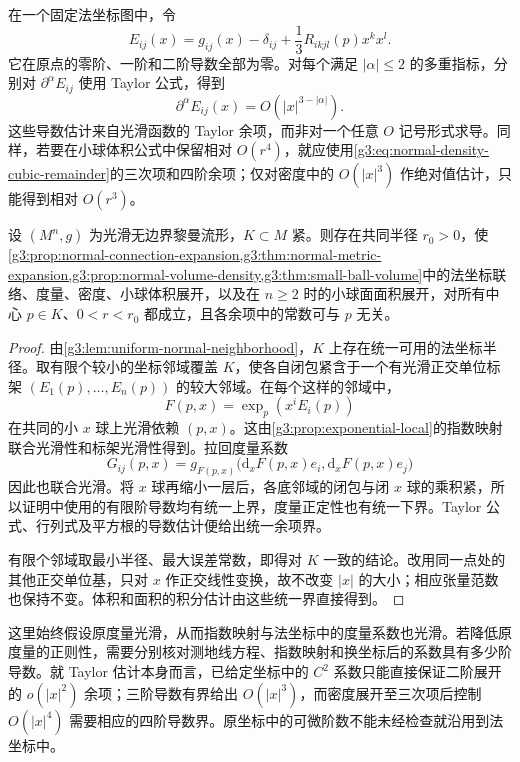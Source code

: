 \ProseParagraphBreak

在一个固定法坐标图中，令
\[
	E_{ij}(x)=g_{ij}(x)-\delta_{ij}+\frac13R_{ikjl}(p)x^kx^l.
\]
它在原点的零阶、一阶和二阶导数全部为零。对每个满足 \(|\alpha|\le2\) 的多重指标，分别对 \(\partial^\alpha E_{ij}\) 使用 Taylor 公式，得到
\begin{equation}\label{g3:eq:normal-metric-remainder-derivatives}
	\partial^\alpha E_{ij}(x)=O(|x|^{3-|\alpha|}).
\end{equation}
这些导数估计来自光滑函数的 Taylor 余项，而非对一个任意 \(O\) 记号形式求导。同样，若要在小球体积公式中保留相对 \(O(r^4)\)，就应使用\eqref{g3:eq:normal-density-cubic-remainder}的三次项和四阶余项；仅对密度中的 \(O(|x|^3)\) 作绝对值估计，只能得到相对 \(O(r^3)\)。

\begin{proposition}\label{g3:prop:normal-expansion-uniform-remainders}
	设 \((M^n,g)\) 为光滑无边界黎曼流形，\(K\subset M\) 紧。则存在共同半径 \(r_0>0\)，使\cref{g3:prop:normal-connection-expansion,g3:thm:normal-metric-expansion,g3:prop:normal-volume-density,g3:thm:small-ball-volume}中的法坐标联络、度量、密度、小球体积展开，以及在 \(n\ge2\) 时的小球面面积展开，对所有中心 \(p\in K\)、\(0<r<r_0\) 都成立，且各余项中的常数可与 \(p\) 无关。
\end{proposition}
\begin{proof}
	由\cref{g3:lem:uniform-normal-neighborhood}，\(K\) 上存在统一可用的法坐标半径。取有限个较小的坐标邻域覆盖 \(K\)，使各自闭包紧含于一个有光滑正交单位标架 \((E_1(p),\ldots,E_n(p))\) 的较大邻域。在每个这样的邻域中，
	\[
		F(p,x)=\exp_p(x^iE_i(p))
	\]
	在共同的小 \(x\) 球上光滑依赖 \((p,x)\)。这由\cref{g3:prop:exponential-local}的指数映射联合光滑性和标架光滑性得到。拉回度量系数
	\[
		G_{ij}(p,x)=g_{F(p,x)}
		\bigl(\mathrm d_xF(p,x)e_i,\mathrm d_xF(p,x)e_j\bigr)
	\]
	因此也联合光滑。将 \(x\) 球再缩小一层后，各底邻域的闭包与闭 \(x\) 球的乘积紧，所以证明中使用的有限阶导数均有统一上界，度量正定性也有统一下界。Taylor 公式、行列式及平方根的导数估计便给出统一余项界。

	有限个邻域取最小半径、最大误差常数，即得对 \(K\) 一致的结论。改用同一点处的其他正交单位基，只对 \(x\) 作正交线性变换，故不改变 \(|x|\) 的大小；相应张量范数也保持不变。体积和面积的积分估计由这些统一界直接得到。
\end{proof}

这里始终假设原度量光滑，从而指数映射与法坐标中的度量系数也光滑。若降低原度量的正则性，需要分别核对测地线方程、指数映射和换坐标后的系数具有多少阶导数。就 Taylor 估计本身而言，已给定坐标中的 \(C^2\) 系数只能直接保证二阶展开的 \(o(|x|^2)\) 余项；三阶导数有界给出 \(O(|x|^3)\)，而密度展开至三次项后控制 \(O(|x|^4)\) 需要相应的四阶导数界。原坐标中的可微阶数不能未经检查就沿用到法坐标中。
